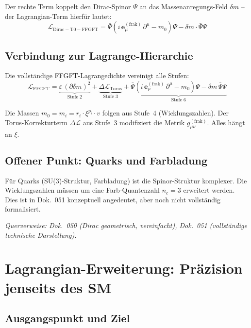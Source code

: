 Der rechte Term koppelt den Dirac-Spinor $\Psi$ an das
Massenanregungs-Feld $\delta m$ -- der Lagrangian-Term hierfür
lautet:
\begin{equation}
    \mathcal{L}_{\mathrm{Dirac-T0-FFGFT}}
    = \bar{\Psi}\left(i\,\mathbf{e}_\mu^{(\mathrm{frak})}\,\partial^\mu
    - m_0\right)\Psi - \delta m \cdot \bar{\Psi}\Psi
\end{equation}

\subsection{Verbindung zur Lagrange-Hierarchie}

Die vollständige FFGFT-Lagrangedichte vereinigt alle Stufen:
\begin{equation}
    \boxed{
    \mathcal{L}_{\mathrm{FFGFT}} = \underbrace{\varepsilon\,(\partial\delta m)^2}_{\text{Stufe 2}}
    + \underbrace{\Delta\mathcal{L}_{\mathrm{Torus}}}_{\text{Stufe 3}}
    + \underbrace{\bar{\Psi}(i\,\mathbf{e}_\mu^{(\mathrm{frak})}\,\partial^\mu
    - m_0)\Psi - \delta m\,\bar{\Psi}\Psi}_{\text{Stufe 6}}
    }
\end{equation}

Die Massen $m_0 = m_i = r_i \cdot \xi^{p_i} \cdot v$ folgen aus
Stufe~4 (Wicklungszahlen). Der Torus-Korrekturterm $\Delta\mathcal{L}$
aus Stufe~3 modifiziert die Metrik $g_{\mu\nu}^{(\mathrm{frak})}$.
Alles hängt an $\xi$.

\subsection{Offener Punkt: Quarks und Farbladung}

Für Quarks (SU(3)-Struktur, Farbladung) ist die Spinor-Struktur
komplexer. Die Wicklungszahlen müssen um eine Farb-Quantenzahl
$n_c = 3$ erweitert werden. Dies ist in Dok.~051 konzeptuell
angedeutet, aber noch nicht vollständig formalisiert.

\noindent\textit{Querverweise: Dok.~050 (Dirac geometrisch, vereinfacht),
Dok.~051 (vollständige technische Darstellung).}

\section{Lagrangian-Erweiterung: Präzision jenseits des \texorpdfstring{SM}{SM}}

\subsection{Ausgangspunkt und Ziel}

